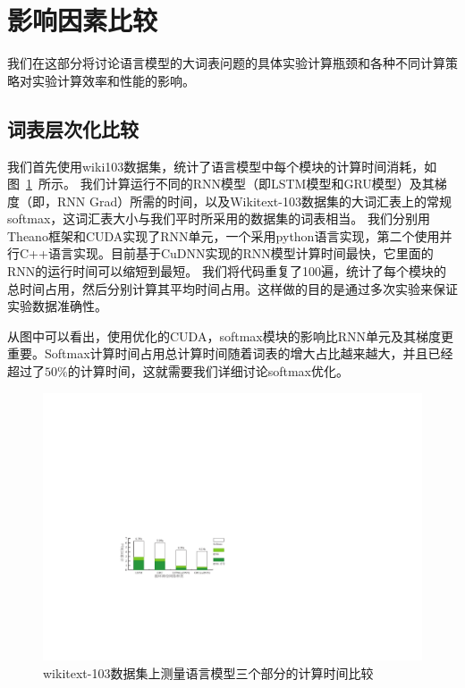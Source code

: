 \section{影响因素比较}
我们在这部分将讨论语言模型的大词表问题的具体实验计算瓶颈和各种不同计算策略对实验计算效率和性能的影响。
\subsection{词表层次化比较}
我们首先使用wiki103数据集，统计了语言模型中每个模块的计算时间消耗，如图~\ref{fig:rnn_timing}~所示。 我们计算运行不同的RNN模型（即LSTM模型和GRU模型）及其梯度（即，RNN Grad）所需的时间，以及Wikitext-103数据集的大词汇表上的常规softmax，这词汇表大小与我们平时所采用的数据集的词表相当。 我们分别用Theano框架和CUDA实现了RNN单元，一个采用python语言实现，第二个使用并行C++语言实现。目前基于CuDNN实现的RNN模型计算时间最快，它里面的RNN的运行时间可以缩短到最短。 我们将代码重复了100遍，统计了每个模块的总时间占用，然后分别计算其平均时间占用。这样做的目的是通过多次实验来保证实验数据准确性。

从图中可以看出，使用优化的CUDA，softmax模块的影响比RNN单元及其梯度更重要。Softmax计算时间占用总计算时间随着词表的增大占比越来越大，并且已经超过了$50\%$的计算时间，这就需要我们详细讨论softmax优化。
\begin{figure}[!ht]
  \centering
  \includegraphics[width=1\columnwidth]{./figures/rnn_timing.pdf}
  \caption{wikitext-103数据集上测量语言模型三个部分的计算时间比较}\label{fig:rnn_timing}
\end{figure}



